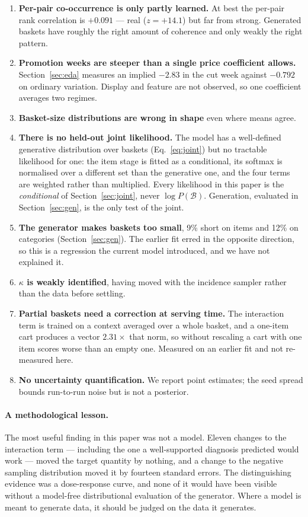 \documentclass[11pt]{article}
\begin{document}
\begin{enumerate}
\item \textbf{Per-pair co-occurrence is only partly learned.} At best the per-pair rank
correlation is $+0.091$ --- real ($z=+14.1$) but far from strong. Generated baskets have
roughly the right amount of coherence and only weakly the right pattern.
\item \textbf{Promotion weeks are steeper than a single price coefficient allows.}
Section~\ref{sec:eda} measures an implied $-2.83$ in the cut week against $-0.792$ on
ordinary variation. Display and feature are not observed, so one coefficient averages two
regimes.
\item \textbf{Basket-size distributions are wrong in shape} even where means agree.
\item \textbf{There is no held-out joint likelihood.} The model has a well-defined
generative distribution over baskets (Eq.~\ref{eq:joint}) but no tractable likelihood for
one: the item stage is fitted as a conditional, its softmax is normalised over a
different set than the generative one, and the four terms are weighted rather than
multiplied. Every likelihood in this paper is the \emph{conditional} of
Section~\ref{sec:joint}, never $\log P(\mathcal{B})$. Generation, evaluated in
Section~\ref{sec:gen}, is the only test of the joint.

\item \textbf{The generator makes baskets too small}, 9\% short on items and 12\% on
categories (Section~\ref{sec:gen}). The earlier fit erred in the opposite direction, so this
is a regression the current model introduced, and we have not explained it.
\item \textbf{$\kappa$ is weakly identified}, having moved with the incidence sampler
rather than the data before settling.
\item \textbf{Partial baskets need a correction at serving time.} The interaction term is
trained on a context averaged over a whole basket, and a one-item cart produces a vector
$2.31\times$ that norm, so without rescaling a cart with one item scores worse than an empty
one. Measured on an earlier fit and not re-measured here.

\item \textbf{No uncertainty quantification.} We report point estimates; the seed spread
bounds run-to-run noise but is not a posterior.
\end{enumerate}

\paragraph{A methodological lesson.} The most useful finding in this paper was not a
model. Eleven changes to the interaction term --- including the one a well-supported
diagnosis predicted would work --- moved the target quantity by nothing, and a change to
the negative sampling distribution moved it by fourteen standard errors. The
distinguishing evidence was a dose-response curve, and none of it would have been visible
without a model-free distributional evaluation of the generator. Where a model is meant to
generate data, it should be judged on the data it generates.
\end{document}
